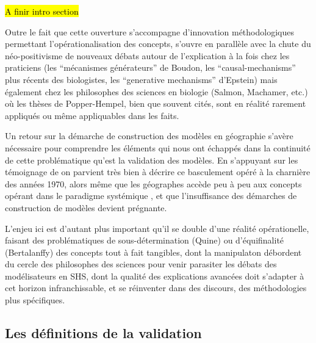 \hl{ A finir intro section}


Outre le fait que cette ouverture s'accompagne d'innovation méthodologiques permettant l'opérationalisation des concepts, s'ouvre en parallèle avec la chute du néo-positivisme de nouveaux débats autour de l'explication \autocite{Hedstrom2010} à la fois chez les praticiens (les \enquote{mécanismes générateurs} de Boudon, les \foreignquote{english}{causal-mechanisms} plus récents des biologistes, les \foreignquote{english}{generative mechanisms} d'Epstein) mais également chez les philosophes des sciences en biologie (Salmon, Machamer, etc.) où les thèses de Popper-Hempel, bien que souvent cités, sont en réalité rarement appliqués ou même appliquables dans les faits. \autocite{Bechet2013} 

Un retour sur la démarche de construction des modèles en géographie s'avère nécessaire pour comprendre les éléments qui nous ont échappés dans la continuité de cette problématique qu'est la validation des modèles. En s'appuyant sur les témoignage de \autocite{Batty2001, Pumain2003} on parvient très bien à décrire ce basculement opéré à la charnière des années 1970, alors même que les géographes accède peu à peu aux concepts opérant dans le paradigme systémique \autocite{Harvey1969}, et que l'insuffisance des démarches de construction de modèles devient prégnante.

L'enjeu ici est d'autant plus important qu'il se double d'une réalité opérationelle, faisant des problématiques de sous-détermination (Quine) ou d'équifinalité (Bertalanffy) des concepts tout à fait tangibles, dont la manipulaton débordent du cercle des philosophes des sciences pour venir parasiter les débats des modélisateurs en SHS, dont la qualité des explications avancées doit s'adapter à cet horizon infranchissable, et se réinventer dans des discours, des méthodologies plus spécifiques.


\subsection{Les définitions de la validation}
\label{ssec:def_generique_validation}

